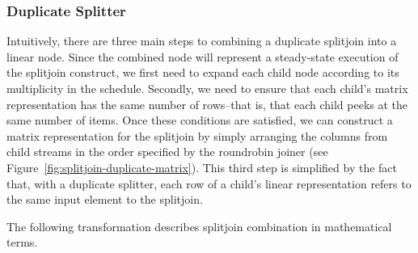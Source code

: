 \subsubsection{Duplicate Splitter}

Intuitively, there are three main steps to combining a duplicate
splitjoin into a linear node.  Since the combined node will represent
a steady-state execution of the splitjoin construct, we first need to
expand each child node according to its multiplicity in the schedule.
Secondly, we need to ensure that each child's matrix representation
has the same number of rows--that is, that each child peeks at the
same number of items.  Once these conditions are satisfied, we can
construct a matrix representation for the splitjoin by simply
arranging the columns from child streams in the order specified by the
roundrobin joiner (see Figure~\ref{fig:splitjoin-duplicate-matrix}).
This third step is simplified by the fact that, with a duplicate
splitter, each row of a child's linear representation refers to the
same input element to the splitjoin.

The following transformation describes splitjoin combination in
mathematical terms.



